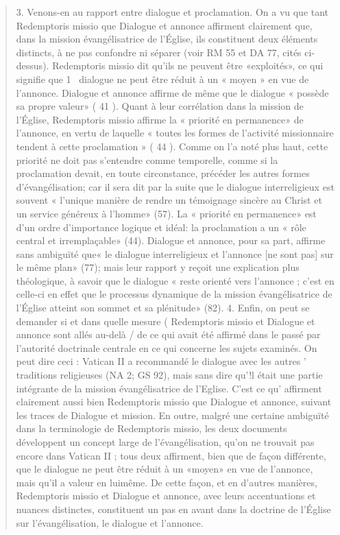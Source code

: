 \begin{quote}
3. Venons-en au rapport entre dialogue et proclamation. On
a vu que tant Redemptoris missio que Dialogue et annonce
affirment clairement que, dans la mission évangélisatrice de
l'Église, ils constituent deux éléments distincts, à ne pas
confondre ni séparer (voir RM 55 et DA 77, cités ci-dessus).
Redemptoris missio dit qu'ils ne peuvent être «exploités», ce
qui signifie que 1~ dialogue ne peut être réduit à un « moyen »
en vue de l'annonce. Dialogue et annonce affirme de même
que le dialogue « possède sa propre valeur» ( 41 ). Quant à leur
corrélation dans la mission de l'Église, Redemptoris missio
affirme la « priorité en permanence» de l'annonce, en vertu de
laquelle « toutes les formes de l'activité missionnaire tendent
à cette proclamation » ( 44 ). Comme on l'a noté plus haut, cette
priorité ne doit pas s'entendre comme temporelle, comme si la
proclamation devait, en toute circonstance, précéder les autres
formes d'évangélisation; car il sera dit par la suite que le dialogue
interreligieux est souvent « l'unique manière de rendre
un témoignage sincère au Christ et un service généreux à
l'homme» (57). La « priorité en permanence» est d'un ordre
d'importance logique et idéal: la proclamation a un « rôle central
et irremplaçable» (44). Dialogue et annonce, pour sa part,
affirme sans ambiguïté que« le dialogue interreligieux et l'annonce
[ne sont pas] sur le même plan» (77); mais leur rapport
y reçoit une explication plus théologique, à savoir que le dialogue
« reste orienté vers l'annonce ; c'est en celle-ci en effet
que le processus dynamique de la mission évangélisatrice de
l'Église atteint son sommet et sa plénitude» (82).
4. Enfin, on peut se demander si et dans quelle mesure
( Redemptoris missio et Dialogue et annonce sont allés au-delà
/ de ce qui avait été affirmé dans le passé par l'autorité doctrinale
centrale en ce qui concerne les sujets examinés. On peut
dire ceci : Vatican II a recommandé le dialogue avec les autres
' traditions religieuses (NA 2; GS 92), mais sans dire qu'!l était
une partie intégrante de la mission évangélisatrice de l'Eglise.
C'est ce qu' affirment clairement aussi bien Redemptoris missio
que Dialogue et annonce, suivant les traces de Dialogue et
mission. En outre, malgré une certaine ambiguïté dans la terminologie
de Redemptoris missio, les deux documents développent
un concept large de l'évangélisation, qu'on ne trouvait
pas encore dans Vatican II ; tous deux affirment, bien que de
façon différente, que le dialogue ne peut être réduit à un
«moyen» en vue de l'annonce, mais qu'il a valeur en luimême.
De cette façon, et en d'autres manières, Redemptoris
missio et Dialogue et annonce, avec leurs accentuations et
nuances distinctes, constituent un pas en avant dans la doctrine
de l'Église sur l'évangélisation, le dialogue et l'annonce.
\end{quote}

